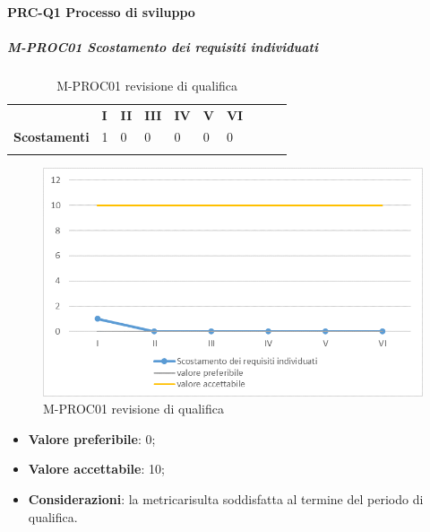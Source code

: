\paragraph*{PRC-Q1 Processo di sviluppo}
\subparagraph{M-PROC01 Scostamento dei requisiti individuati} \mbox{}
\begin{longtable}[H!] {						
		>{}p{50mm}  		
		>{}p{8mm}
		>{}p{8mm}		
		>{}p{8mm}		
		>{}p{8mm}		
		>{}p{8mm}		
		>{}p{8mm}
		>{}p{8mm}
		>{}p{8mm}
		>{}p{8mm}
	}
	\rowcolor{gray!50}
	\textbf{} & \textbf{I} & \textbf{II} & \textbf{III} & \textbf{IV} & \textbf{V} & \textbf{VI} \TBstrut \\ [2mm]
	\textbf{Scostamenti} & 1 & 0 & 0 & 0 & 0 & 0 \TBstrut \\ [2mm]
	\rowcolor{white}
	\caption{M-PROC01 revisione di qualifica}
\end{longtable}
\begin{figure}[H] 	
	\includegraphics[width=\linewidth]{./img/grafici/RQ1.png}	
	\caption{M-PROC01 revisione di qualifica}	
\end{figure}
\begin{itemize}
	\item \textbf{Valore preferibile}: 0;
	\item \textbf{Valore accettabile}: 10;
	\item \textbf{Considerazioni}: la metrica\glosp risulta soddisfatta al termine del periodo di qualifica.
\end{itemize}

